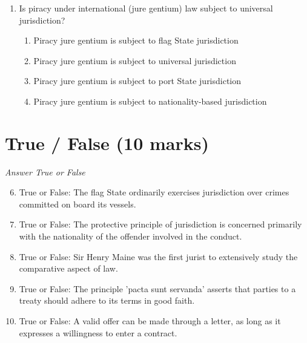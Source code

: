 \documentclass[12pt]{article}
\begin{document}
\begin{enumerate}[label=\arabic*.]
\begin{enumerate}[label=(\alph*)]
    \item Standard-setting means putting forward binding legal standards
    \item Standard-setting means merely proposing binding legal standards
    \item Standard-setting means putting forward non-binding legal standards
    \item Standard-setting means setting certain standards of conduct in human rights treaties
\end{enumerate}
\item Is piracy under international (jure gentium) law subject to universal jurisdiction?
\begin{enumerate}[label=(\alph*)]
    \item Piracy jure gentium is subject to flag State jurisdiction
    \item Piracy jure gentium is subject to universal jurisdiction
    \item Piracy jure gentium is subject to port State jurisdiction
    \item Piracy jure gentium is subject to nationality-based jurisdiction
\end{enumerate}
\end{enumerate}

\section*{True / False (10 marks)}
\textit{Answer True or False}
\begin{enumerate}[label=\arabic*.]
\setcounter{enumi}{5}
\item True or False: The flag State ordinarily exercises jurisdiction over crimes committed on board its vessels.
\item True or False: The protective principle of jurisdiction is concerned primarily with the nationality of the offender involved in the conduct.
\item True or False: Sir Henry Maine was the first jurist to extensively study the comparative aspect of law.
\item True or False: The principle 'pacta sunt servanda' asserts that parties to a treaty should adhere to its terms in good faith.
\item True or False: A valid offer can be made through a letter, as long as it expresses a willingness to enter a contract.
\end{enumerate}
\end{document}
